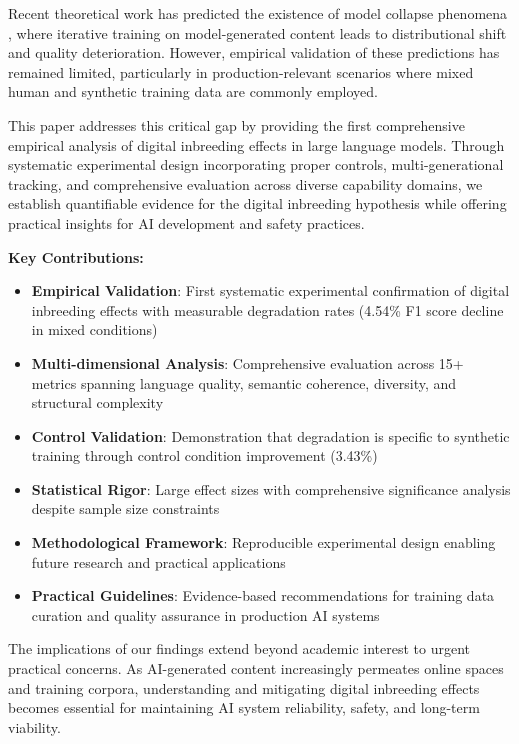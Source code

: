 \documentclass[11pt]{article}
\begin{document}
Recent theoretical work has predicted the existence of model collapse phenomena \citep{shumailov2023curse}, where iterative training on model-generated content leads to distributional shift and quality deterioration. However, empirical validation of these predictions has remained limited, particularly in production-relevant scenarios where mixed human and synthetic training data are commonly employed.

This paper addresses this critical gap by providing the first comprehensive empirical analysis of digital inbreeding effects in large language models. Through systematic experimental design incorporating proper controls, multi-generational tracking, and comprehensive evaluation across diverse capability domains, we establish quantifiable evidence for the digital inbreeding hypothesis while offering practical insights for AI development and safety practices.

\textbf{Key Contributions:}
\begin{itemize}
    \item \textbf{Empirical Validation}: First systematic experimental confirmation of digital inbreeding effects with measurable degradation rates (4.54\% F1 score decline in mixed conditions)
    \item \textbf{Multi-dimensional Analysis}: Comprehensive evaluation across 15+ metrics spanning language quality, semantic coherence, diversity, and structural complexity
    \item \textbf{Control Validation}: Demonstration that degradation is specific to synthetic training through control condition improvement (3.43\%)
    \item \textbf{Statistical Rigor}: Large effect sizes with comprehensive significance analysis despite sample size constraints
    \item \textbf{Methodological Framework}: Reproducible experimental design enabling future research and practical applications
    \item \textbf{Practical Guidelines}: Evidence-based recommendations for training data curation and quality assurance in production AI systems
\end{itemize}

The implications of our findings extend beyond academic interest to urgent practical concerns. As AI-generated content increasingly permeates online spaces and training corpora, understanding and mitigating digital inbreeding effects becomes essential for maintaining AI system reliability, safety, and long-term viability.
\end{document}
